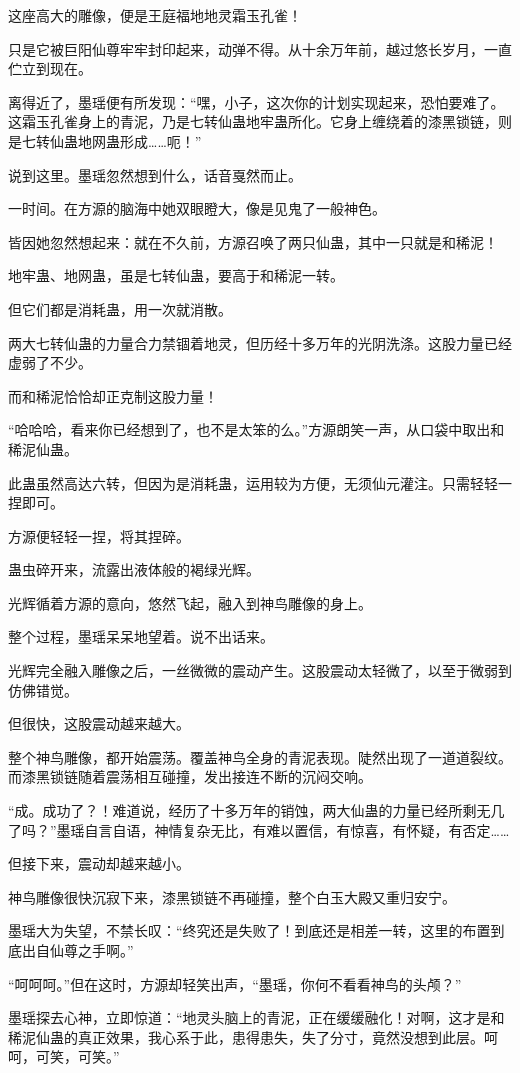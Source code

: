\begin{this_body}
这座高大的雕像，便是王庭福地地灵霜玉孔雀！

只是它被巨阳仙尊牢牢封印起来，动弹不得。从十余万年前，越过悠长岁月，一直伫立到现在。

离得近了，墨瑶便有所发现：“嘿，小子，这次你的计划实现起来，恐怕要难了。这霜玉孔雀身上的青泥，乃是七转仙蛊地牢蛊所化。它身上缠绕着的漆黑锁链，则是七转仙蛊地网蛊形成……呃！”

说到这里。墨瑶忽然想到什么，话音戛然而止。

一时间。在方源的脑海中她双眼瞪大，像是见鬼了一般神色。

皆因她忽然想起来：就在不久前，方源召唤了两只仙蛊，其中一只就是和稀泥！

地牢蛊、地网蛊，虽是七转仙蛊，要高于和稀泥一转。

但它们都是消耗蛊，用一次就消散。

两大七转仙蛊的力量合力禁锢着地灵，但历经十多万年的光阴洗涤。这股力量已经虚弱了不少。

而和稀泥恰恰却正克制这股力量！

“哈哈哈，看来你已经想到了，也不是太笨的么。”方源朗笑一声，从口袋中取出和稀泥仙蛊。

此蛊虽然高达六转，但因为是消耗蛊，运用较为方便，无须仙元灌注。只需轻轻一捏即可。

方源便轻轻一捏，将其捏碎。

蛊虫碎开来，流露出液体般的褐绿光辉。

光辉循着方源的意向，悠然飞起，融入到神鸟雕像的身上。

整个过程，墨瑶呆呆地望着。说不出话来。

光辉完全融入雕像之后，一丝微微的震动产生。这股震动太轻微了，以至于微弱到仿佛错觉。

但很快，这股震动越来越大。

整个神鸟雕像，都开始震荡。覆盖神鸟全身的青泥表现。陡然出现了一道道裂纹。而漆黑锁链随着震荡相互碰撞，发出接连不断的沉闷交响。

“成。成功了？！难道说，经历了十多万年的销蚀，两大仙蛊的力量已经所剩无几了吗？”墨瑶自言自语，神情复杂无比，有难以置信，有惊喜，有怀疑，有否定……

但接下来，震动却越来越小。

神鸟雕像很快沉寂下来，漆黑锁链不再碰撞，整个白玉大殿又重归安宁。

墨瑶大为失望，不禁长叹：“终究还是失败了！到底还是相差一转，这里的布置到底出自仙尊之手啊。”

“呵呵呵。”但在这时，方源却轻笑出声，“墨瑶，你何不看看神鸟的头颅？”

墨瑶探去心神，立即惊道：“地灵头脑上的青泥，正在缓缓融化！对啊，这才是和稀泥仙蛊的真正效果，我心系于此，患得患失，失了分寸，竟然没想到此层。呵呵，可笑，可笑。”


\end{this_body}
